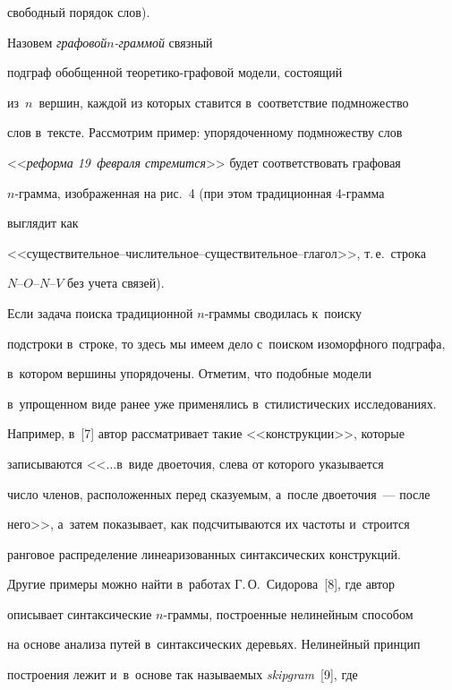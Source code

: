 свободный порядок слов). 


Назовем \textit{графовой\linebreak $n$-грам\-мой} связный 


подграф обобщенной тео\-ре\-ти\-ко-гра\-фо\-вой модели, со\-сто\-ящий 


из~$n$~вер\-шин, каждой из которых ставится в~соответствие подмножество 


слов в~тексте. Рассмотрим пример: упорядоченному подмножеству слов 


<<\textit{реформа 19~февраля стремится}>> будет соответствовать графовая 


$n$-грам\-ма, изображенная на рис.~4 (при этом традиционная 4-грам\-ма 


выглядит как  


<<су\-щест\-ви\-тель\-ное--чис\-ли\-тель\-ное--су\-щест\-ви\-тель\-ное--гла\-гол>>, т.\,е.\ строка  


$N$--$O$--$N$--$V$ без учета связей).


 





  Если задача поиска традиционной $n$-грам\-мы сводилась к~поиску 


подстроки в~строке, то здесь мы имеем дело с~поиском изоморфного подграфа, 


в~котором вершины упорядочены. Отметим, что подобные модели 


в~упрощенном виде ранее уже применялись в~стилистических исследованиях. 


Например, в~[7] автор рассматривает такие <<конструкции>>, которые 


записываются <<$\ldots$в~виде двоеточия, слева от которого указывается 


число членов, расположенных перед сказуемым, а~после двоеточия~--- после 


него>>, а~затем показывает, как подсчитываются их частоты и~строится 


ранговое распределение линеаризованных синтаксических конструкций. 


Другие примеры можно найти в~работах Г.\,О.~Сидорова~[8], где автор 


описывает синтаксические $n$-грам\-мы, построенные нелинейным способом 


на основе анализа путей в~синтаксических деревьях. Нелинейный принцип 


построения лежит и~в~основе так называемых \textit{skipgram}~[9], где 


